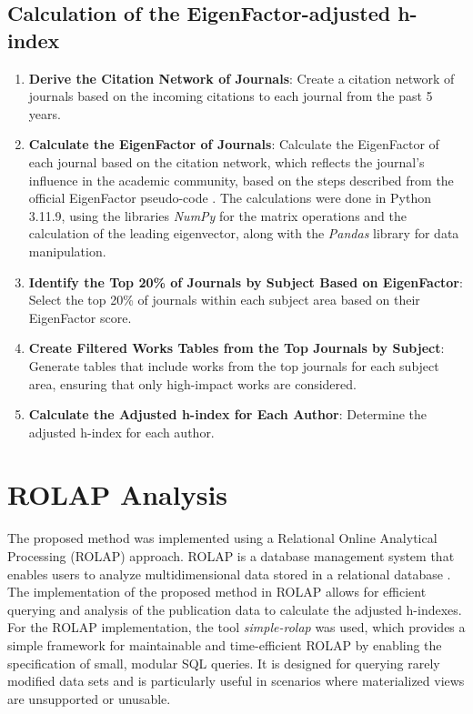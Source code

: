 \subsection{Calculation of the EigenFactor-adjusted h-index}
\begin{enumerate}
      \item \textbf{Derive the Citation Network of Journals}: Create a citation network of journals based on the
            incoming citations to each journal from the past 5 years.
      \item \textbf{Calculate the EigenFactor of Journals}: Calculate the EigenFactor of each journal based on the
            citation network, which reflects the journal's influence in the academic community, based on the steps
            described from the official EigenFactor pseudo-code \cite{west2008pseudocode}. The calculations were done  in Python
            3.11.9, using the libraries \emph{NumPy} for the matrix operations and the
            calculation of the leading eigenvector, along with the \emph{Pandas} library
            for data manipulation.
      \item \textbf{Identify the Top 20\% of Journals by Subject Based on EigenFactor}: Select the top 20\% of journals within
            each subject area based on their EigenFactor score\@.

      \item \textbf{Create Filtered Works Tables from the Top Journals by Subject}: Generate tables that include works from
            the top journals for each subject area, ensuring that only high-impact works are considered.

      \item \textbf{Calculate the Adjusted h-index for Each Author}: Determine the adjusted h-index for each author.
\end{enumerate}

\section{ROLAP Analysis}

The proposed method was implemented using a Relational Online Analytical
Processing (ROLAP) approach. ROLAP is a database management system that enables
users to analyze multidimensional data stored in a relational database
\cite{codd1993providing}. The implementation of the proposed method in ROLAP
allows for efficient querying and analysis of the publication data to calculate
the adjusted h-indexes. For the ROLAP implementation, the tool
\emph{simple-rolap} \cite{simple-rolap} was used, which provides a simple
framework for maintainable and time-efficient ROLAP by enabling the
specification of small, modular SQL queries. It is designed for querying rarely
modified data sets and is particularly useful in scenarios where materialized
views are unsupported or unusable.

